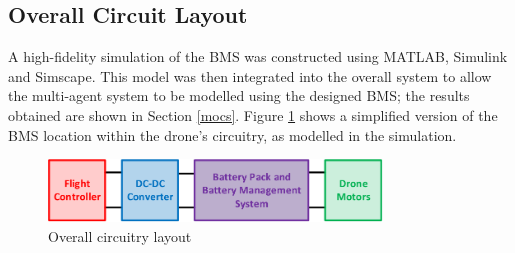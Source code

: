 \subsection{Overall Circuit Layout}

A high-fidelity simulation of the \gls{BMS} was constructed using MATLAB, Simulink and Simscape. This model was then integrated into the overall system to allow the multi-agent system to be modelled using the designed \gls{BMS}; the results obtained are shown in Section \ref{mocs}. Figure \ref{fig:bms_ovrlayout} shows a simplified version of the \gls{BMS} location within the drone's circuitry, as modelled in the simulation.

\begin{figure}[H]
  \centering
  \includegraphics[width=0.79\textwidth]{figs/Samuel/Figures/BMS-cropped.pdf}
  \caption{Overall circuitry layout}
  \label{fig:bms_ovrlayout}
\end{figure}

